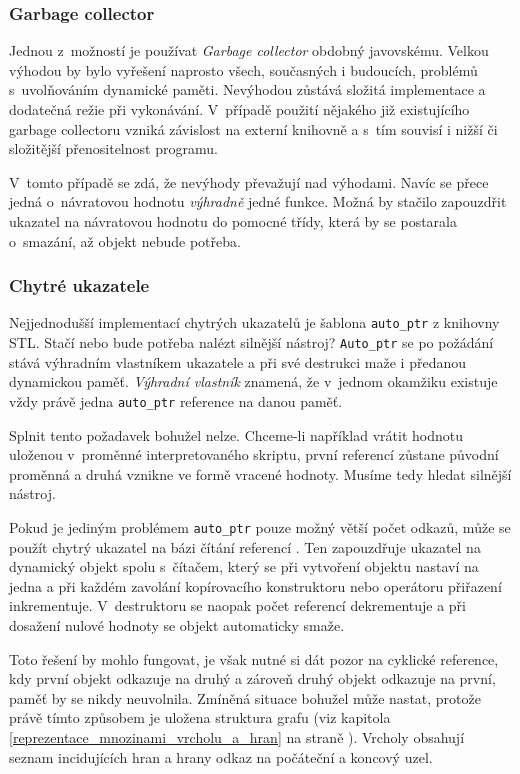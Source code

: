 \documentclass[11pt,twoside,a4paper]{book}
\begin{document}
\subsubsection{Garbage collector}

Jednou z~možností je používat \textit{Garbage collector} obdobný javovskému. Velkou výhodou by bylo vyřešení naprosto všech, současných i budoucích, problémů s~u\-vol\-ňo\-vá\-ním dynamické paměti. Nevýhodou zůstává složitá implementace a dodatečná režie při vykonávání. V~případě použití nějakého již existujícího garbage collectoru vzniká závislost na externí knihovně a s~tím souvisí i nižší či složitější přenositelnost programu.

V~tomto případě se zdá, že nevýhody převažují nad výhodami. Navíc se přece jedná o~ná\-vra\-to\-vou hodnotu \textit{výhradně} jedné funkce. Možná by stačilo zapouzdřit ukazatel na návratovou hodnotu do pomocné třídy, která by se postarala o~smazání, až objekt nebude potřeba.


\subsubsection{Chytré ukazatele}
\label{chytre_ukazatele}

Nejjednodušší implementací chytrých ukazatelů je šablona \texttt{auto\_ptr} z knihovny STL. Stačí nebo bude potřeba nalézt silnější nástroj? \texttt{Auto\_ptr} se po požádání stává výhradním vlast\-ní\-kem ukazatele a při své destrukci maže i předanou dynamickou paměť. \textit{Výhradní vlastník} znamená, že v~jednom okamžiku existuje vždy právě jedna \texttt{auto\_ptr} reference na danou paměť.

Splnit tento požadavek bohužel nelze. Chceme-li například vrátit hodnotu uloženou v~pro\-měn\-né interpretovaného skriptu, první referencí zůstane původní proměnná a druhá vznikne ve formě vracené hodnoty. Musíme tedy hledat silnější nástroj.

Pokud je jediným problémem \texttt{auto\_ptr} pouze možný větší počet odkazů, může se použít chytrý ukazatel na bázi čítání referencí \cite{smartp}. Ten zapouzdřuje ukazatel na dynamický objekt spolu s~čítačem, který se při vytvoření objektu nastaví na jedna a při každém zavolání kopírovacího konstruktoru nebo operátoru přiřazení inkrementuje. V~destruktoru se naopak počet referencí dekrementuje a při dosažení nulové hodnoty se objekt automaticky smaže.

Toto řešení by mohlo fungovat, je však nutné si dát pozor na cyklické reference, kdy první objekt odkazuje na druhý a zároveň druhý objekt odkazuje na první, paměť by se nikdy neuvolnila. Zmíněná situace bohužel může nastat, protože právě tímto způsobem je uložena struktura grafu (viz kapitola \ref{reprezentace_mnozinami_vrcholu_a_hran} na straně \pageref{reprezentace_mnozinami_vrcholu_a_hran}). Vrcholy obsahují seznam incidujících hran a hrany odkaz na počáteční a koncový uzel.
\end{document}
